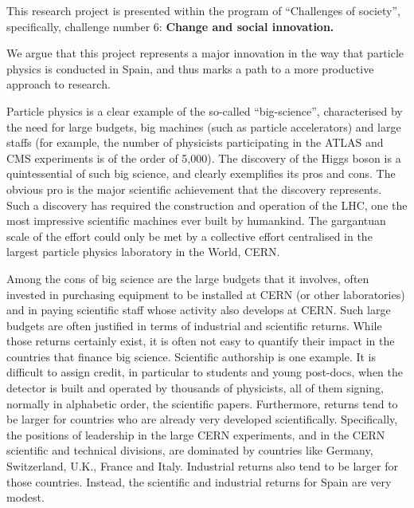 %
This research project is presented within the program of ``Challenges of society'', specifically, challenge number 6: {\bf Change and social innovation.}

We argue that this project represents a major innovation in the way that particle physics is conducted in Spain, and thus marks a path to a more productive approach to research.

Particle physics is a clear example of the so-called ``big-science'',
characterised by the need for large budgets, big machines (such as particle accelerators) and large staffs (for example, the number of physicists participating in the ATLAS and CMS experiments is of the order of 5,000). The discovery of the Higgs boson is a quintessential of such big science, and clearly exemplifies its pros and cons. The obvious pro is the major scientific achievement that the discovery represents. Such a discovery has required the construction and operation of the LHC, one the most impressive scientific machines ever built by humankind. The gargantuan scale of the effort could only be met by a collective effort centralised in the largest particle physics laboratory in the World, CERN.  

Among the cons of big science are the large budgets that it involves, often invested in purchasing equipment to be installed at CERN (or other laboratories) and in paying scientific staff whose activity also develops at CERN. Such large budgets are often justified in terms of industrial and scientific returns. While those returns certainly exist, it is often not easy to quantify their impact in the countries that finance big science. Scientific authorship is one example. It is difficult to assign credit, in particular to students and young post-docs, when the detector is built and operated by thousands of physicists, all of them signing, normally in alphabetic order, the scientific papers. Furthermore, returns tend to be larger for countries who are already very developed scientifically. Specifically, the positions of leadership in the large CERN experiments, and in the CERN scientific and technical divisions, are dominated by countries like Germany, Switzerland, U.K., France and Italy. Industrial returns also tend to be larger for those countries. Instead, the scientific and industrial returns for Spain are very modest. 

